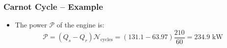 \documentclass[10pt,compress]{beamer}
\begin{document}
\begin{frame}
 \frametitle{Carnot Cycle -- Example}
    \begin{itemize}
     \item <1-> The power $\mathcal{P}$ of the engine is:
         \begin{displaymath}
           \mathcal{P}= \left(Q_{s}-Q_{r}\right) \mathcal{N}_{\text{cycles}}=\left(131.1-63.97\right)\displaystyle\frac{210}{60}=234.9\text{ kW}
         \end{displaymath}
     
    \end{itemize}
\end{frame}
\end{document}
